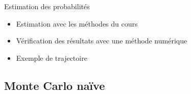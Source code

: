 \documentclass{beamer} %
\begin{document}
	\begin{frame}[t]{Estimation des probabilités}
		\begin{itemize}
			\item<+-> Estimation avec les méthodes du cours
			\item<+-> Vérification des résultats avec une méthode numérique 
			\item<+-> Exemple de trajectoire 
		\end{itemize}
	\end{frame}
	
	\subsection{Monte Carlo naïve} %
	\label{sub:monte_carlo_naive}
	
\end{document}
